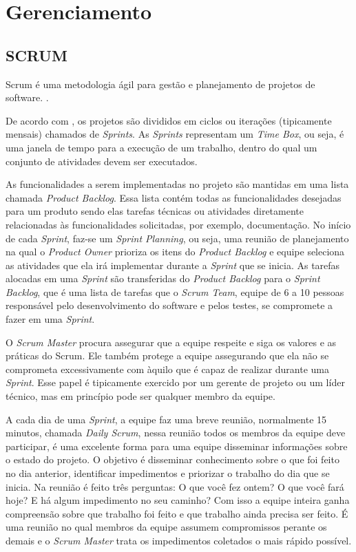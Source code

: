 \section{Gerenciamento}

\subsection{SCRUM}

Scrum é uma metodologia ágil para gestão e planejamento de projetos de software. \cite{scrum}.

De acordo com \cite{scrum}, os projetos são divididos em ciclos ou iterações (tipicamente mensais) chamados de
\textit{Sprints}.  As \textit{Sprints} representam um \textit{Time Box}, ou seja, é uma janela de tempo para a execução de um trabalho, dentro do qual um conjunto de atividades devem ser executados.

As funcionalidades a serem implementadas no projeto são mantidas em uma lista chamada \textit{Product Backlog}. Essa lista contém todas as funcionalidades desejadas para um produto sendo elas tarefas técnicas ou atividades diretamente relacionadas às funcionalidades solicitadas, por exemplo, documentação. No início de cada \textit{Sprint}, faz-se um \textit{Sprint Planning}, ou seja, uma reunião de planejamento na qual o \textit{Product Owner} prioriza os itens do \textit{Product Backlog} e equipe seleciona as atividades que ela irá implementar durante a \textit{Sprint} que se inicia. As tarefas alocadas em uma \textit{Sprint} são transferidas do \textit{Product Backlog} para o \textit{Sprint Backlog}, que é uma lista de tarefas que o \textit{Scrum Team}, equipe de 6 a 10 pessoas responsável pelo desenvolvimento do software e pelos testes, se compromete a fazer em uma \textit{Sprint}. \cite{scrum}

O \textit{Scrum Master} procura assegurar que a equipe respeite e siga os valores e as práticas do Scrum. Ele também protege a equipe assegurando que ela não se comprometa excessivamente com àquilo que é capaz de realizar durante uma \textit{Sprint}. Esse papel é tipicamente exercido por um gerente de projeto ou um líder técnico, mas em princípio pode ser qualquer membro da equipe.

A cada dia de uma \textit{Sprint}, a equipe faz uma breve reunião, normalmente 15 minutos, chamada \textit{Daily Scrum}, nessa reunião todos os membros da equipe deve participar, é uma excelente forma para uma equipe disseminar informações sobre o estado do projeto. O objetivo é disseminar conhecimento sobre o que foi feito no dia anterior, identificar impedimentos e priorizar o trabalho do dia que se inicia. Na reunião é feito três perguntas: O que você fez ontem? O que você fará hoje? E há algum impedimento no seu caminho? Com isso a equipe inteira ganha compreensão sobre que trabalho foi feito e que trabalho ainda precisa ser feito. É uma reunião no qual membros da equipe assumem compromissos perante os demais e o \textit{Scrum Master} trata os impedimentos coletados o mais rápido possível. \cite{scrum}

